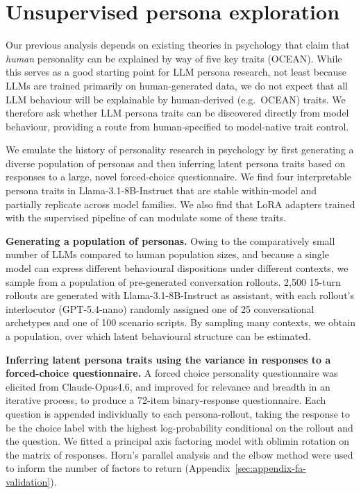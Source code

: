 \section{Unsupervised persona exploration}\label{sec:unsupervised-persona-exploration}

Our previous analysis depends on existing theories in psychology that claim that \textit{human} personality can be explained by way of five key traits (OCEAN). While this serves as a good starting point for LLM persona research, not least because LLMs are trained primarily on human-generated data, we do not expect that all LLM behaviour will be explainable by human-derived (e.g.\ OCEAN) traits. We therefore ask whether LLM persona traits can be discovered directly from model behaviour, providing a route from human-specified to model-native trait control.

We emulate the history of personality research in psychology by first generating a diverse population of personas and then inferring latent persona traits based on responses to a large, novel forced-choice questionnaire. We find four interpretable persona traits in Llama-3.1-8B-Instruct that are stable within-model and partially replicate across model families. We also find that LoRA adapters trained with the supervised pipeline of  can modulate some of these traits.

\textbf{Generating a population of personas.}
Owing to the comparatively small number of LLMs compared to human population sizes, and because a single model can express different behavioural dispositions under different contexts, we sample from a population of pre-generated conversation rollouts.
2{,}500 15-turn rollouts are generated with Llama-3.1-8B-Instruct as assistant, with each rollout's interlocutor (GPT-5.4-nano) randomly assigned one of 25 conversational archetypes and one of 100 scenario scripts. By sampling many contexts, we obtain a population, over which latent behavioural structure can be estimated.

\textbf{Inferring latent persona traits using the variance in responses to a forced-choice questionnaire.}
A forced choice personality questionnaire was elicited from Claude-Opus4.6, and improved for relevance and breadth in an iterative process, to produce a 72-item binary-response questionnaire. Each question is appended individually to each persona-rollout, taking the response to be the choice label with the highest log-probability conditional on the rollout and the question. We fitted a principal axis factoring model with oblimin rotation on the matrix of responses. Horn's parallel analysis and the elbow method were used to inform the number of factors to return (Appendix~\ref{sec:appendix-fa-validation}).

